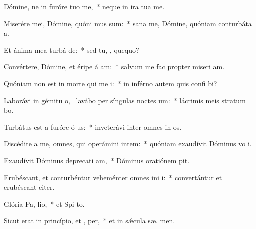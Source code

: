 \item Dómine, ne in furóre tuo  me,~* neque in ira tua  me.
\item Miserére mei, Dómine, quóni mus sum:~* sana me, Dómine, quóniam conturbáta   a.
\item Et ánima mea turbá  de:~* sed tu, , quequo?
\item Convértere, Dómine, et éripe á am:~* salvum me fac propter miseri am.
\item Quóniam non est in morte qui me  i:~* in inférno autem quis confi bi?
\item Laborávi in gémitu o,~\pscross{} lavábo per síngulas noctes  um:~* lácrimis meis stratum  bo.
\item Turbátus est a furóre ó us:~* inveterávi inter omnes in os.
\item Discédite a me, omnes, qui operámini intem:~* quóniam exaudívit Dóminus vo  i.
\item Exaudívit Dóminus deprecati am,~* Dóminus oratiónem  pit.
\item Erubéscant, et conturbéntur veheménter omnes ini i:~* convertántur et erubéscant  citer.
\item Glória Pa,  lio,~* et Spi to.
\item Sicut erat in princípio, et ,  per,~* et in sǽcula sæ. men.
